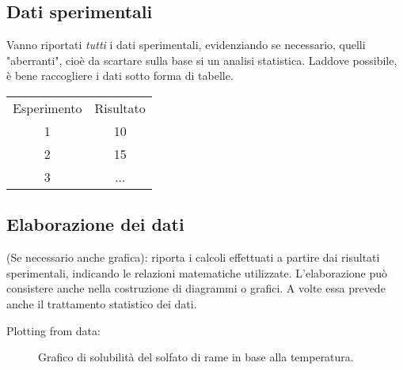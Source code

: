 \subsection{Dati sperimentali}
Vanno riportati \textit{tutti} i dati sperimentali, evidenziando se necessario, quelli "aberranti", cioè da scartare sulla base si un analisi statistica. Laddove possibile, è bene raccogliere i dati sotto forma di tabelle.
\vspace{1ex}
\begin {center}
\begin{tabular}{c|c}
     Esperimento &  Risultato\\
     1 & 10\\
     2 & 15\\
     3 & ...
\end{tabular}
\end {center}

\subsection{Elaborazione dei dati}
(Se necessario anche grafica): riporta i calcoli effettuati a partire dai risultati sperimentali, indicando le relazioni matematiche utilizzate. L'elaborazione può consistere anche nella costruzione di diagrammi o grafici. A volte essa prevede anche il trattamento statistico dei dati.

Plotting from data:
\begin{center}
\vspace{2ex}
\begin{figure}[!ht]
    \centering
    \caption{Grafico di solubilità del solfato di rame in base alla temperatura.}
    \label{plt:1}
\end{figure}

\end{center}
\newpage


